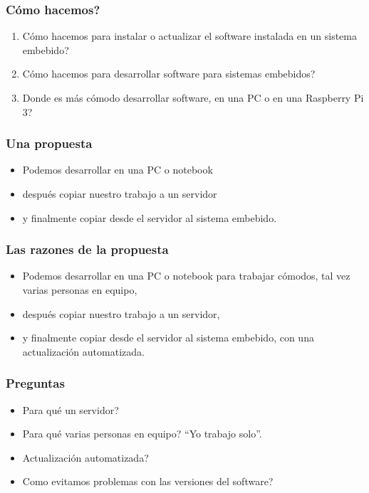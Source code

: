 \documentclass{beamer}
\begin{document}

\begin{frame}
\frametitle{\textquestiondown C\'{o}mo hacemos?}

\begin{enumerate}
\item<1-> \textquestiondown C\'{o}mo hacemos para instalar o actualizar el software instalada en un sistema embebido?
\item<2-> \textquestiondown C\'{o}mo hacemos para desarrollar software para sistemas embebidos?
\item<3-> \textquestiondown Donde es m\'{a}s c\'{o}modo desarrollar software, en una PC o en una Raspberry Pi 3?
\end{enumerate}
\end{frame}


\begin{frame}
\frametitle{Una propuesta}
\begin{itemize}
\item Podemos desarrollar en una PC o notebook
\item despu\'{e}s copiar nuestro trabajo a un servidor
\item y finalmente copiar desde el servidor al sistema embebido. 
\end{itemize}
\end{frame}

\begin{frame}
\frametitle{Las razones de la propuesta}
\begin{itemize}
\item<1-> Podemos desarrollar en una PC o notebook para trabajar c\'{o}modos, tal vez varias personas en equipo,
\item<2-> despu\'{e}s copiar nuestro trabajo a un servidor, 
\item<3-> y finalmente copiar desde el servidor al sistema embebido, con una actualizaci\'{o}n automatizada.
\end{itemize}
\end{frame}

\begin{frame}
\frametitle{Preguntas}
\begin{itemize}
\item \textquestiondown Para qu\'{e} un servidor?
\item \textquestiondown Para qu\'{e} varias personas en equipo? ``Yo trabajo solo''.
\item \textquestiondown Actualizaci\'{o}n automatizada?
\item \textquestiondown Como evitamos problemas con las versiones del software?
\end{itemize}
\end{frame}
\end{document}
